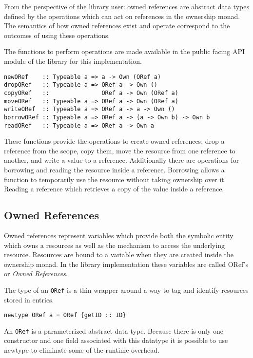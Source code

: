 \documentclass[onehalf,11pt]{beavtex}
\begin{document}
From the perspective of the library user: owned references are abstract
data types defined by the operations which can act on references in the
ownership monad.
The semantics of how owned references exist and operate correspond to the
outcomes of using these operations.

The functions to perform operations are made available in the public facing API
module of the library for this implementation.

\begin{verbatim}
newORef    :: Typeable a => a -> Own (ORef a)
dropORef   :: Typeable a => ORef a -> Own ()
copyORef   ::               ORef a -> Own (ORef a)
moveORef   :: Typeable a => ORef a -> Own (ORef a)
writeORef  :: Typeable a => ORef a -> a -> Own ()
borrowORef :: Typeable a => ORef a -> (a -> Own b) -> Own b
readORef   :: Typeable a => ORef a -> Own a
\end{verbatim}

These functions provide the operations to create owned references,
drop a reference from the scope, copy them, move the resource from one reference
to another,  and write a value to a reference.
Additionally there are operations for borrowing and reading the resource inside
a reference.
Borrowing allows a function to temporarily use the resource without taking
ownership over it. Reading a reference which retrieves a copy of the
value inside a reference.

\subsection{Owned References}

Owned references represent variables which provide both the symbolic entity
which owns a resources as well as the mechanism to access the underlying resource.
Resources are bound to a variable when they are created inside the ownership
monad. In the library implementation these variables are called ORef's or
\textit{Owned References}.

The type of an \texttt{ORef} is a thin wrapper around a way to tag and identify
resources stored in entries.

\begin{verbatim}
newtype ORef a = ORef {getID :: ID}
\end{verbatim}

An \texttt{ORef} is a parameterized abstract data type. Because there is only
one constructor and one field associated with this datatype it is possible to
use newtype to eliminate some of the runtime overhead.
\end{document}
